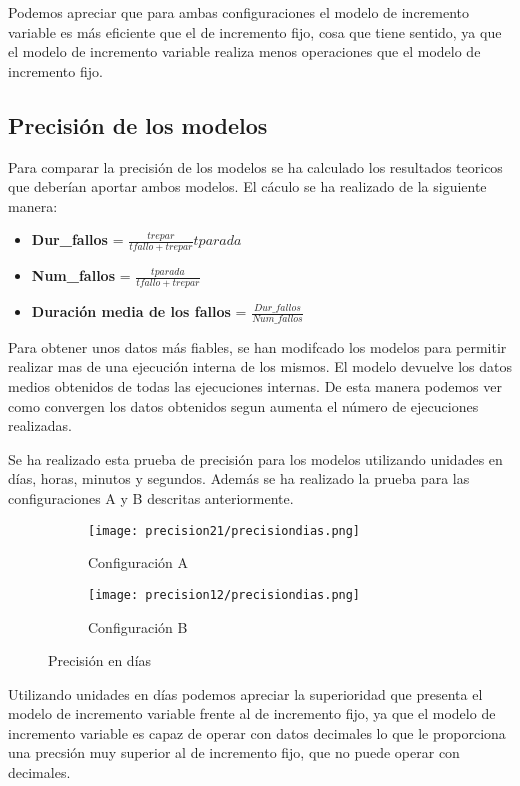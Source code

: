Podemos apreciar que para ambas configuraciones el modelo de incremento variable es más eficiente que el de incremento fijo, cosa que tiene sentido, ya que el modelo de incremento variable realiza menos operaciones que el modelo de incremento fijo.

\newpage

\subsection{Precisión de los modelos}
Para comparar la precisión de los modelos se ha calculado los resultados teoricos que deberían aportar ambos modelos. El cáculo se ha realizado de la siguiente manera:
\begin{itemize}
	\item \textbf{Dur\_fallos} = $ \frac{trepar}{tfallo + trepar}tparada  $
	\item \textbf{Num\_fallos} = $ \frac{tparada}{tfallo + trepar}  $
	\item \textbf{Duración media de los fallos} = $\frac{Dur\_fallos}{Num\_fallos}$
\end{itemize}

Para obtener unos datos más fiables, se han modifcado los modelos para permitir realizar mas de una ejecución interna de los mismos. El modelo devuelve los datos medios obtenidos de todas las ejecuciones internas. De esta manera podemos ver como convergen los datos obtenidos segun aumenta el número de ejecuciones realizadas.

Se ha realizado esta prueba de precisión para los modelos utilizando unidades en días, horas, minutos y segundos. Además se ha realizado la prueba para las configuraciones A y B descritas anteriormente.

\begin{figure}[H]
	\centering
	\begin{subfigure}[b]{0.8\textwidth}
		\centering
		\texttt{[image: precision21/precisiondias.png]}
		\caption{Configuración A}
	\end{subfigure}
	\hfill
	\begin{subfigure}[b]{0.8\textwidth}
		\centering
		\texttt{[image: precision12/precisiondias.png]}
		\caption{Configuración B}
	\end{subfigure}
	\caption{Precisión en días}
\end{figure}

Utilizando unidades en días podemos apreciar la superioridad que presenta el modelo de incremento variable frente al de incremento fijo, ya que el modelo de incremento variable es capaz de operar con datos decimales lo que le proporciona una precsión muy superior al de incremento fijo, que no puede operar con decimales.


